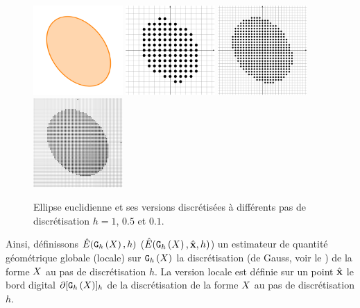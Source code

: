 \begin{figure}[ht]{
    \begin{center}
    \includegraphics[width=3.4cm]{images/Notions/multi-ellipse-0}
    \includegraphics[width=3.4cm]{images/Notions/multi-ellipse-1}
    \includegraphics[width=3.4cm]{images/Notions/multi-ellipse-2}
    \includegraphics[width=3.4cm]{images/Notions/multi-ellipse-4}
    \end{center}}
    \caption{Ellipse euclidienne et ses versions discrétisées à différents pas de discrétisation $h = 1$, $0.5$ et $0.1$.\label{fig:digital-ellipse}}
\end{figure}


Ainsi, définissons $\hat{E}(\mathtt{G}_{h}\left(X\right),h)$ (\respp $\hat{E}(\mathtt{G}_{h}\left(X\right),\hat{\mathbf{x}},h)$) un
estimateur de quantité géométrique globale (\resp locale) sur $\mathtt{G}_{h}\left(X\right)$ la
discrétisation (de Gauss, voir le ) de la forme
$X$ au pas de discrétisation $h$. La version locale est définie sur un
point $\hat{\mathbf{x}}$ le bord digital $\partial\lbrack \mathtt{G}_{h}\left(X\right) \rbrack_{h}$ de la discrétisation
de la forme $X$ au pas de discrétisation $h$.


